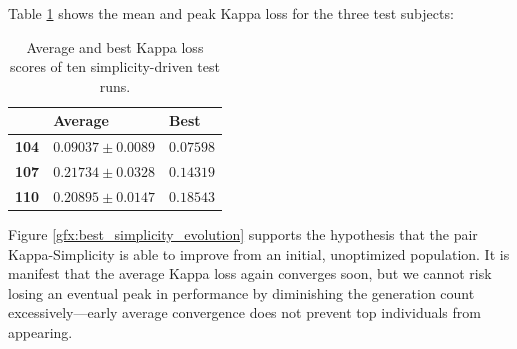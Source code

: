     Table \ref{table:average_peak_kappa_simplicity} shows the mean and peak Kappa loss for the three test subjects:

    \vspace{0.3cm}

    \begin{table}[h]

        \centering
        \setlength\arrayrulewidth{0.8pt}

        \begin{tabular}{| >{\centering\arraybackslash}m{0.7in} | >{\centering\arraybackslash}m{1.1in} | >{\centering\arraybackslash}m{1.1in} |}

			\hline
			\rowcolor{RoyalBlue}
			 & \textbf{Average} & \textbf{Best} \\
            \hline
            \cellcolor{RoyalBlue}\textbf{104} & $0.09037 \pm 0.0089$ & $0.07598$ \\
            \hline
            \cellcolor{RoyalBlue}\textbf{107} & $0.21734 \pm 0.0328$ & $0.14319$ \\
            \hline
            \cellcolor{RoyalBlue}\textbf{110} & $0.20895 \pm 0.0147$ & $0.18543$ \\
            \hline

        \end{tabular}

        \caption{Average and best Kappa loss scores of ten simplicity-driven test runs.}\label{table:average_peak_kappa_simplicity}

    \end{table}

    Figure \ref{gfx:best_simplicity_evolution} supports the hypothesis that the pair Kappa-Simplicity is able to improve from an initial, unoptimized population. It is manifest that the average Kappa loss again converges soon, but we cannot risk losing an eventual peak in performance by diminishing the generation count excessively---early average convergence does not prevent top individuals from appearing.

    \vspace{0.2cm}

